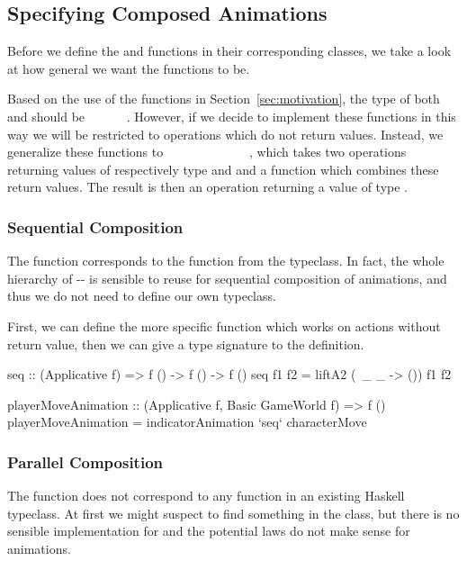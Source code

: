 \subsection{Specifying Composed Animations}

Before we define the  and  functions in their corresponding classes, we take a look at how general we want the functions to be.

Based on the use of the functions in Section~\ref{sec:motivation}, the type of both  and  should be ~\hs{()}~\hs{->}~~\hs{->}~~\hs{()}. However, if we decide to implement these functions in this way we will be restricted to operations which do not return values. Instead, we generalize these functions to ~~\hs{->}~~~\hs{->}~\hs{(}~\hs{->}~~\hs{->}~\hs{)}~\hs{->}~~, which takes two operations returning values of respectively type  and  and a function which combines these return values. The result is then an operation returning a value of type .

\subsubsection{Sequential Composition}

The  function corresponds to the  function from the  typeclass. In fact, the whole hierarchy of -- is sensible to reuse for sequential composition of animations, and thus we do not need to define our own typeclass.

First, we can define the more specific  function which works on actions without return value, then we can give a type signature to the  definition.

\begin{code}
seq :: (Applicative f) => f () -> f () -> f ()
seq f1 f2 = liftA2 (\ _ _ -> ()) f1 f2

playerMoveAnimation :: (Applicative f, Basic GameWorld f) => f ()
playerMoveAnimation = indicatorAnimation `seq` characterMove
\end{code}

\subsubsection{Parallel Composition}

The  function does not correspond to any function in an existing Haskell typeclass. At first we might suspect to find something in the  class, but there is no sensible implementation for  and the potential laws do not make sense for animations.

